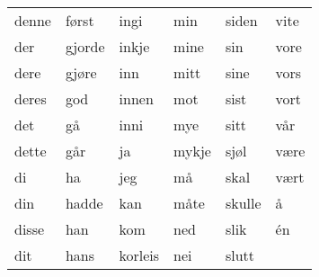 \begin{table}[htbp]
\begin{tabular}{l l l l l l}
    denne & først & ingi & min & siden & vite \\
    der & gjorde & inkje & mine & sin & vore \\
    dere & gjøre & inn & mitt & sine & vors \\
    deres & god & innen & mot & sist & vort \\
    det & gå & inni & mye & sitt & vår \\
    dette & går & ja & mykje & sjøl & være \\
    di & ha & jeg & må & skal & vært \\
    din & hadde & kan & måte & skulle & å \\
    disse & han & kom & ned & slik & én \\
    dit & hans & korleis & nei & slutt &  \\
    \bottomrule
\end{tabular}
\end{table}


